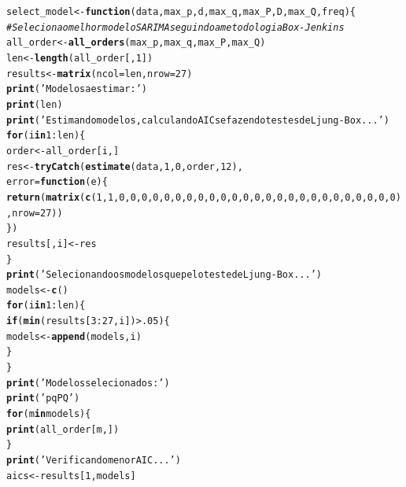 \documentclass{article}\usepackage[]{graphicx}\usepackage[]{color}
\makeatletter
\newcommand{\hlnum}[1]{\textcolor[rgb]{0.686,0.059,0.569}{#1}}%
\newcommand{\hlstr}[1]{\textcolor[rgb]{0.192,0.494,0.8}{#1}}%
\newcommand{\hlcom}[1]{\textcolor[rgb]{0.678,0.584,0.686}{\textit{#1}}}%
\newcommand{\hlopt}[1]{\textcolor[rgb]{0,0,0}{#1}}%
\newcommand{\hlstd}[1]{\textcolor[rgb]{0.345,0.345,0.345}{#1}}%
\newcommand{\hlkwa}[1]{\textcolor[rgb]{0.161,0.373,0.58}{\textbf{#1}}}%
\newcommand{\hlkwb}[1]{\textcolor[rgb]{0.69,0.353,0.396}{#1}}%
\newcommand{\hlkwc}[1]{\textcolor[rgb]{0.333,0.667,0.333}{#1}}%
\newcommand{\hlkwd}[1]{\textcolor[rgb]{0.737,0.353,0.396}{\textbf{#1}}}%
\newenvironment{kframe}{%
 \def\at@end@of@kframe{}%
 \ifinner\ifhmode%
  \def\at@end@of@kframe{\end{minipage}}%
  \begin{minipage}{\columnwidth}%
 \fi\fi%
 \def\FrameCommand##1{\hskip\@totalleftmargin \hskip-\fboxsep
 \colorbox{shadecolor}{##1}\hskip-\fboxsep
     \hskip-\linewidth \hskip-\@totalleftmargin \hskip\columnwidth}%
 \MakeFramed {\advance\hsize-\width
   \@totalleftmargin\z@ \linewidth\hsize
   \@setminipage}}%
 {\par\unskip\endMakeFramed%
 \at@end@of@kframe}
\newenvironment{knitrout}{}{} %
\makeatother
\begin{document}
\begin{knitrout}
\begin{kframe}
\begin{alltt}
\hlstd{select_model} \hlkwb{<-} \hlkwa{function}\hlstd{(}\hlkwc{data}\hlstd{,}\hlkwc{max_p}\hlstd{,}\hlkwc{d}\hlstd{,}\hlkwc{max_q}\hlstd{,}\hlkwc{max_P}\hlstd{,}\hlkwc{D}\hlstd{,}\hlkwc{max_Q}\hlstd{,}\hlkwc{freq}\hlstd{)\{}
  \hlcom{# Seleciona o melhor modelo SARIMA seguindo a metodologia Box-Jenkins}
  \hlstd{all_order} \hlkwb{<-} \hlkwd{all_orders}\hlstd{(max_p,max_q,max_P,max_Q)}
  \hlstd{len}       \hlkwb{<-} \hlkwd{length}\hlstd{(all_order[,}\hlnum{1}\hlstd{])}
  \hlstd{results}   \hlkwb{<-} \hlkwd{matrix}\hlstd{(}\hlkwc{ncol}\hlstd{=len,}\hlkwc{nrow}\hlstd{=}\hlnum{27}\hlstd{)}
  \hlkwd{print}\hlstd{(}\hlstr{'Modelos a estimar:'}\hlstd{)}
  \hlkwd{print}\hlstd{(len)}
  \hlkwd{print}\hlstd{(}\hlstr{'Estimando modelos, calculando AICs e fazendo testes de Ljung-Box...'}\hlstd{)}
  \hlkwa{for} \hlstd{(i} \hlkwa{in} \hlnum{1}\hlopt{:}\hlstd{len)\{}
    \hlstd{order} \hlkwb{<-} \hlstd{all_order[i,]}
    \hlstd{res}   \hlkwb{<-} \hlkwd{tryCatch}\hlstd{(}\hlkwd{estimate}\hlstd{(data,}\hlnum{1}\hlstd{,}\hlnum{0}\hlstd{,order,}\hlnum{12}\hlstd{),}
                      \hlkwc{error} \hlstd{=} \hlkwa{function}\hlstd{(}\hlkwc{e}\hlstd{)\{}
                          \hlkwd{return}\hlstd{(}\hlkwd{matrix}\hlstd{(}\hlkwd{c}\hlstd{(}\hlnum{1}\hlstd{,}\hlnum{1}\hlstd{,}\hlnum{0}\hlstd{,}\hlnum{0}\hlstd{,}\hlnum{0}\hlstd{,}\hlnum{0}\hlstd{,}\hlnum{0}\hlstd{,}\hlnum{0}\hlstd{,}\hlnum{0}\hlstd{,}\hlnum{0}\hlstd{,}\hlnum{0}\hlstd{,}\hlnum{0}\hlstd{,}\hlnum{0}\hlstd{,}\hlnum{0}\hlstd{,}\hlnum{0}\hlstd{,}\hlnum{0}\hlstd{,}\hlnum{0}\hlstd{,}\hlnum{0}\hlstd{,}\hlnum{0}\hlstd{,}\hlnum{0}\hlstd{,}\hlnum{0}\hlstd{,}\hlnum{0}\hlstd{,}\hlnum{0}\hlstd{,}\hlnum{0}\hlstd{,}\hlnum{0}\hlstd{,}\hlnum{0}\hlstd{,}\hlnum{0}\hlstd{),}\hlkwc{nrow}\hlstd{=}\hlnum{27}\hlstd{))}
                      \hlstd{\})}
    \hlstd{results[,i]} \hlkwb{<-} \hlstd{res}
  \hlstd{\}}
  \hlkwd{print}\hlstd{(}\hlstr{'Selecionando os modelos que pelo teste de Ljung-Box...'}\hlstd{)}
  \hlstd{models} \hlkwb{<-} \hlkwd{c}\hlstd{()}
  \hlkwa{for} \hlstd{(i} \hlkwa{in} \hlnum{1}\hlopt{:}\hlstd{len)\{}
    \hlkwa{if} \hlstd{(}\hlkwd{min}\hlstd{(results[}\hlnum{3}\hlopt{:}\hlnum{27}\hlstd{,i])} \hlopt{>} \hlnum{.05}\hlstd{)\{}
      \hlstd{models} \hlkwb{<-} \hlkwd{append}\hlstd{(models,i)}
    \hlstd{\}}
  \hlstd{\}}
  \hlkwd{print}\hlstd{(}\hlstr{'Modelos selecionados:'}\hlstd{)}
  \hlkwd{print}\hlstd{(}\hlstr{'p q P Q'}\hlstd{)}
  \hlkwa{for} \hlstd{(m} \hlkwa{in} \hlstd{models)\{}
    \hlkwd{print}\hlstd{(all_order[m,])}
  \hlstd{\}}
  \hlkwd{print}\hlstd{(}\hlstr{'Verificando menor AIC...'}\hlstd{)}
  \hlstd{aics} \hlkwb{<-} \hlstd{results[}\hlnum{1}\hlstd{,models]}

\end{alltt}
\end{kframe}
\end{knitrout}
\end{document}
